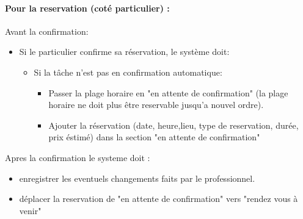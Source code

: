 \documentclass{article}
\begin{document}
\begin{itemize}
\begin{itemize}
\paragraph{Pour la reservation (coté particulier) :}
Avant la confirmation:
	\begin{itemize}
	\item Si le particulier confirme sa réservation, le système doit:
	\begin{itemize}
	\item Si la tâche n'est pas en confirmation automatique:
		\begin{itemize}
		\item Passer la plage horaire en "en attente de confirmation"
			(la plage horaire ne doit plus être reservable jusqu'a nouvel ordre).
		\item Ajouter la réservation (date, heure,lieu, type de reservation, durée, prix éstimé) dans la section "en attente de confirmation"
		\end{itemize}
		\end{itemize}
	\end{itemize}
Apres la confirmation le systeme doit :
		\begin{itemize}
		\item enregistrer les eventuels changements faits par le professionnel.
		\item déplacer la reservation de "en attente de confirmation" vers "rendez vous à venir"
		\end{itemize}



\end{itemize}
\end{itemize}
\end{document}
